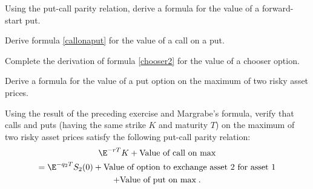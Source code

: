 \begin{prob}
\end{prob}\begin{prob} Using the put-call parity relation, derive a formula for the value of a forward-start put.
\end{prob}\begin{prob} Derive formula \eqref{callonaput} for the value of a call on a put.
\end{prob}\begin{prob} Complete the derivation of formula \eqref{chooser2} for the value of a chooser option.
\end{prob}\begin{prob} Derive a formula for the value of a put option on the maximum of two risky asset prices.
\end{prob}\begin{prob} Using the result of the preceding exercise and Margrabe's formula, verify that calls and puts (having the same strike $K$ and maturity $T$) on the maximum of two risky asset prices satisfy the following put-call parity relation:
\begin{multline*}
\E^{-rT}K + \text{Value of call on max} \\
= \E^{-q_2T}S_2(0) + \text{Value of option to exchange asset 2 for asset 1} \\+ \text{Value of put on max}\;.
\end{multline*}
\end{prob}
